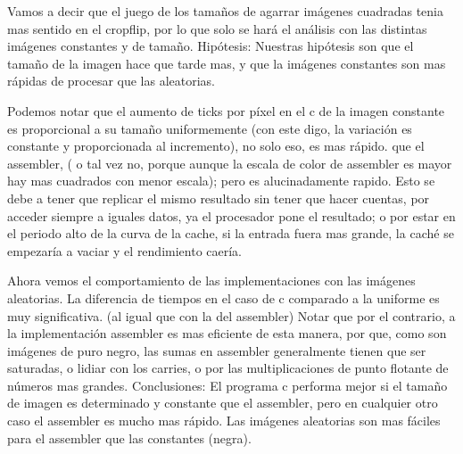    Vamos a decir que el juego de los tamaños de agarrar imágenes cuadradas tenia mas sentido en el cropflip, por lo que solo se hará el análisis con las distintas imágenes constantes y de tamaño. 
   \hfill \break
   Hipótesis:  Nuestras hipótesis son que el tamaño de la imagen hace que tarde mas, y que la imágenes constantes son mas rápidas de procesar que las aleatorias.
   
   
   
   
   \hfill \break
   
   
   Podemos notar que  el aumento de ticks por píxel en el c de la imagen constante es proporcional a su tamaño uniformemente (con este digo, la variación es constante y proporcionada al incremento), no solo eso, es mas rápido. que el assembler, ( o tal vez no, porque aunque la escala de color de assembler es mayor  hay mas cuadrados con menor escala); pero es alucinadamente rapido. Esto se debe a tener que replicar el mismo resultado sin tener que hacer cuentas, por acceder siempre a iguales datos, ya el procesador pone el resultado; o por estar en el periodo alto de la curva de la cache, si la entrada fuera mas grande, la caché se empezaría a vaciar y el rendimiento caería.
   
   
   
   
   \hfill \break
 Ahora vemos el comportamiento de las implementaciones con las imágenes aleatorias. La diferencia de tiempos en el caso de c comparado a la  uniforme es muy significativa. (al igual que con la del assembler) Notar 
que por el contrario, a la implementación assembler es mas eficiente de esta manera,  por que, como son imágenes de puro negro, las sumas en assembler generalmente tienen que ser saturadas, o lidiar con los carries, o por las multiplicaciones de punto flotante de números mas grandes.
\hfill \break
Conclusiones: El programa c performa mejor si el tamaño de imagen es determinado y constante que el assembler, pero en cualquier otro caso el assembler es mucho mas rápido. Las imágenes aleatorias son mas fáciles para el assembler que las constantes (negra). 
\hfill \break
